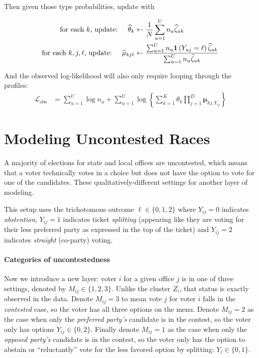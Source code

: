 \documentclass[11pt]{article}
\begin{document}
Then given those type probabilities, update with

\begin{align}
\text{for each \(k\), update: }~~~   \widehat{\theta}_{k} &\leftarrow \frac{1}{N}\sum^U_{u = 1}n_{u}\widehat{\zeta}_{uk}\\
\text{for each \(k, j, \ell\), update: }~~~   \widehat{\mu}_{kj\ell} &\leftarrow\frac{\sum^U_{u=1}n_{u}\bm{1}\left(Y_{uj} = \ell\right)\widehat{\zeta}_{uk}}{\sum^{U}_{u=1}n_{u}\widehat{\zeta}_{uk}}
\end{align}

And the observed log-likelihood will also only require looping through the profiles:
\begin{align}
\mathcal{L}_{\text{obs}} &= \sum^{U}_{u=1}\log n_u + \sum^{U}_{u=1}\log\left\{\sum^{K}_{k=1}\theta_k \prod^{D}_{j=1}\bm{\mu}_{kj,Y_{ij}}\right\}
\end{align}


\section{Modeling Uncontested Races} 

A majority of elections for state and local offices are uncontested, which means that a voter technically votes in a choice but does not have the option to vote for one of the candidates. These qualitatively-different settings for another layer of modeling. 

This setup uses the trichotomous outcome \(\ell \in \{0, 1,  2\}\) where \(Y_{ij} = 0\) indicates \emph{abstention}, \(Y_{ij} = 1\) indicates ticket \emph{splitting} (appearing like they are voting for their less preferred party as expressed in the top of the ticket) and \(Y_{ij} = 2\) indicates \emph{straight} (co-party) voting.  

\paragraph{Categories of uncontestedness} Now we introduce a new layer: voter \(i\) for a given office \(j\) is in one of three settings, denoted by \(M_{ij} \in \{1, 2, 3\}\). Unlike the cluster \(Z_i\), that status is exactly observed in the data. Denote \(M_{ij} = 3\) to mean vote \(j\) for voter \(i\) falls in the \emph{contested} case, so the voter has all three options on the menu. Denote \(M_{ij} = 2\) as the case when only the \emph{preferred party's} candidate is in the contest, so the voter only has options \(Y_{ij} \in \{0, 2\}\). Finally denote \(M_{ij} = 1\) as the case when only the \emph{opposed party's} candidate is in the contest, so the voter only has the option to abstain or ``reluctantly'' vote for the less favored option by splitting: \(Y_{i} \in \{0, 1\}\).
\end{document}

